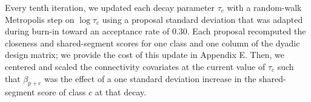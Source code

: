 \documentclass{article}
\begin{document}
Every tenth iteration, we updated each decay parameter $\tau_c$ with a random-walk Metropolis step on $\log\tau_c$ using a proposal standard deviation that was adapted during burn-in toward an acceptance rate of $0.30$. Each proposal recomputed the closeness and shared-segment scores for one class and one column of the dyadic design matrix; we provide the cost of this update in Appendix E. Then, we centered and scaled the connectivity covariates at the current value of $\tau_c$ such that $\beta_{p+c}$ was the effect of a one standard deviation increase in the shared-segment score of class $c$ at that decay.




\end{document}
